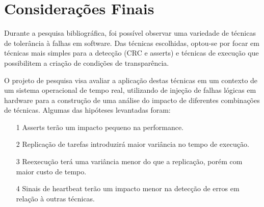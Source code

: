 \chapter{Considerações Finais}
\label{cap:consid}

Durante a pesquisa bibliográfica, foi possível observar uma variedade de técnicas de tolerância à falhas em software. Das técnicas escolhidas, optou-se por focar em técnicas mais simples para a detecção (CRC e asserts) e técnicas de execução que possibilitem a criação de condições de transparência.

O projeto de pesquisa visa avaliar a aplicação destas técnicas em um contexto de um sistema operacional de tempo real, utilizando de injeção de falhas lógicas em hardware para a construção de uma análise do impacto de diferentes combinações de técnicas. Algumas das hipóteses levantadas foram:

\begin{itemize}
    \item[1] Asserts terão um impacto pequeno na performance.
    \item[2] Replicação de tarefas introduzirá maior variância no tempo de execução.
    \item[3] Reexecução terá uma variância menor do que a replicação, porém com maior custo de tempo.
    \item[4] Sinais de heartbeat terão um impacto menor na detecção de erros em relação à outras técnicas.
\end{itemize}


